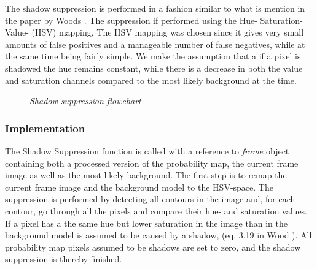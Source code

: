 The shadow suppression is performed in a fashion similar to what is mention in the paper by Woods \cite{Wood}. The suppression if performed using the Hue- Saturation- Value- (HSV) mapping, The HSV mapping was chosen since it gives very small amounts of false positives and a manageable number of false negatives, while at the same time being fairly simple. We make the assumption that a if a pixel is shadowed the hue remains constant, while there is a decrease in both the value and saturation channels compared to the most likely background at the time.

\begin{figure}[htb]
	\centering
	\caption{\textit{Shadow suppression flowchart}}
	\label{fig:shadow_suppression_flow}  %
\end{figure}

\subsubsection{Implementation}
The Shadow Suppression function is called with a reference to \emph{frame} object containing both a processed version of the probability map, the current frame image as well as the most likely background. The first step is to remap the current frame image and the background model to the HSV-space. The suppression is performed by detecting all contours in the image and, for each contour, go through all the pixels and compare their hue- and saturation values. If a pixel has a the same hue but lower saturation in the image than in the background model is assumed to be caused by a shadow, (eq. 3.19 in Wood \cite{Wood}). All probability map pixels assumed to be shadows are set to zero, and the shadow suppression is thereby finished.